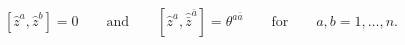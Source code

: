 \begin{equation}\label{cr3}
 [\hat{z}^a,\hat{z}^b]=0\qquad\text{and}\qquad
 [\hat{z}^a,\hat{\bar{z}}^{\bar{a}}]=\theta^{a\bar{a}}
 \qquad\text{for}\qquad
 a,b=1,\ldots,n.
\end{equation}

